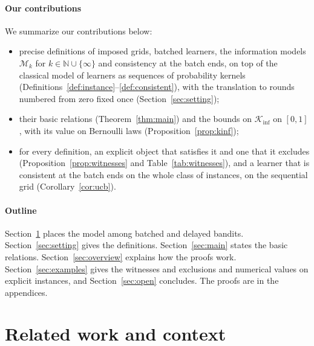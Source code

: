 \documentclass[11pt]{article}
\newcommand{\1}{\mathbf{1}}
\newcommand{\Nat}{\mathbb{N}}
\begin{document}
\paragraph{Our contributions} We summarize our contributions below:
\begin{itemize}
\item precise definitions of imposed grids, batched learners, the information models
  $\mathcal M_k$ for $k\in\Nat\cup\{\infty\}$ and consistency at the batch ends, on top of the
  classical model of learners as sequences of probability kernels
  (Definitions~\ref{def:instance}--\ref{def:consistent}), with the translation to rounds numbered
  from zero fixed once (Section~\ref{sec:setting});
\item their basic relations (Theorem~\ref{thm:main}) and the bounds on $\mathcal K_{\inf}$ on
  $[0,1]$, with its value on Bernoulli laws (Proposition~\ref{prop:kinf});
\item for every definition, an explicit object that satisfies it and one that it excludes
  (Proposition~\ref{prop:witnesses} and Table~\ref{tab:witnesses}), and a learner that is consistent
  at the batch ends on the whole class of instances, on the sequential grid
  (Corollary~\ref{cor:ucb}).
\end{itemize}

\paragraph{Outline} Section~\ref{sec:related} places the model among batched and delayed bandits.
Section~\ref{sec:setting} gives the definitions. Section~\ref{sec:main} states the basic relations.
Section~\ref{sec:overview} explains how the proofs work. Section~\ref{sec:examples} gives the
witnesses and exclusions and numerical values on explicit instances, and Section~\ref{sec:open}
concludes. The proofs are in the appendices.

\section{Related work and context}\label{sec:related}
\end{document}
